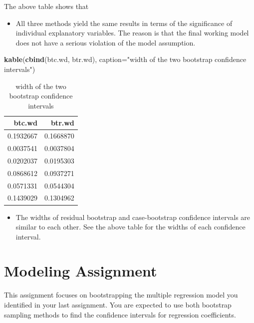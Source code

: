 \documentclass[
]{book}
\newenvironment{Shaded}{\begin{snugshade}}{\end{snugshade}}
\newcommand{\AttributeTok}[1]{\textcolor[rgb]{0.13,0.29,0.53}{#1}}
\newcommand{\FunctionTok}[1]{\textcolor[rgb]{0.13,0.29,0.53}{\textbf{#1}}}
\newcommand{\NormalTok}[1]{#1}
\newcommand{\StringTok}[1]{\textcolor[rgb]{0.31,0.60,0.02}{#1}}
\providecommand{\tightlist}{%
  \setlength{\itemsep}{0pt}\setlength{\parskip}{0pt}}
\begin{document}
The above table shows that

\begin{itemize}
\tightlist
\item
  All three methods yield the same results in terms of the significance of individual explanatory variables. The reason is that the final working model does not have a serious violation of the model assumption.
\end{itemize}

\begin{Shaded}
\begin{Highlighting}[]
\FunctionTok{kable}\NormalTok{(}\FunctionTok{cbind}\NormalTok{(btc.wd, btr.wd), }\AttributeTok{caption=}\StringTok{"width of the two bootstrap confidence intervals"}\NormalTok{)}
\end{Highlighting}
\end{Shaded}

\begin{table}

\caption{\label{tab:unnamed-chunk-103}width of the two bootstrap confidence intervals}
\centering
\begin{tabular}[t]{r|r}
\hline
btc.wd & btr.wd\\
\hline
0.1932667 & 0.1668870\\
\hline
0.0037541 & 0.0037804\\
\hline
0.0202037 & 0.0195303\\
\hline
0.0868612 & 0.0937271\\
\hline
0.0571331 & 0.0544304\\
\hline
0.1439029 & 0.1304962\\
\hline
\end{tabular}
\end{table}

\begin{itemize}
\tightlist
\item
  The widths of residual bootstrap and case-bootstrap confidence intervals are similar to each other. See the above table for the widths of each confidence interval.
\end{itemize}

\hypertarget{modeling-assignment}{%
\section{Modeling Assignment}\label{modeling-assignment}}

This assignment focuses on bootstrapping the multiple regression model you identified in your last assignment. You are expected to use both bootstrap sampling methods to find the confidence intervals for regression coefficients.
\end{document}
